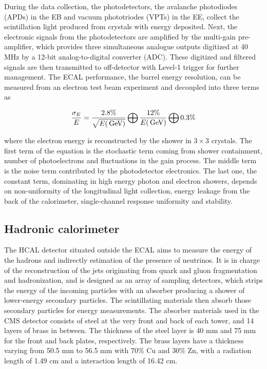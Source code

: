 During the data collection, the photodetectors, the avalanche photodiodes (APDs) in the EB and vacuum phototriodes (VPTs) in the EE, collect the scintillation light produced from crystals with energy deposited. 
Next, the electronic signals from the photodetectors are amplified by the multi-gain pre-amplifier, which provides three simultaneous analogue outputs digitized at 40 MHz by a 12-bit analog-to-digital converter (ADC).
These digitized and filtered signals are then transmitted to off-detector with Level-1 trigger for further management.
The ECAL performance, the barrel energy resolution, can be measured from an electron test beam experiment and decoupled into three terms as
\begin{linenomath}\begin{equation}\label{eq:cms_ecal}
    \frac{\sigma_E}{E} = \frac{2.8\%}{\sqrt{E(\,\text{Ge\hspace{-.08em}V})}} \bigoplus \frac{12\%}{E(\,\text{Ge\hspace{-.08em}V})} \bigoplus 0.3\%
\end{equation}\end{linenomath}
where the electron energy is reconstructed by the shower in $3\times 3$ crystals.
The first term of the equation is the stochastic term coming from shower containment, number of photoelectrons and fluctuations in the gain process.
The middle term is the noise term contributed by the photodetector electronics.
The last one, the constant term, dominating in high energy photon and electron showers, depends on non-uniformity of the longitudinal light collection, energy leakage from the back of the calorimeter, single-channel response uniformity and stability.

\subsection{Hadronic calorimeter}
The HCAL detector situated outside the ECAL aims to measure the energy of the hadrons and indirectly estimation of the presence of neutrinos.
It is in charge of the reconstruction of the jets originating from quark and gluon fragmentation and hadronization, and is designed as an array of sampling detectors, which strips the energy of the incoming particles with an absorber producing a shower of lower-energy secondary particles.
The scintillating materials then absorb those secondary particles for energy measurements.
The absorber materials used in the CMS detector consists of steel at the very front and back of each tower, and 14 layers of brass in between.
The thickness of the steel layer is 40 mm and 75 mm for the front and back plates, respectively.
The brass layers have a thickness varying from 50.5 mm to 56.5 mm with $70\%$ Cu and $30\%$ Zn, with a radiation length of 1.49 cm and a interaction length of 16.42 cm.


